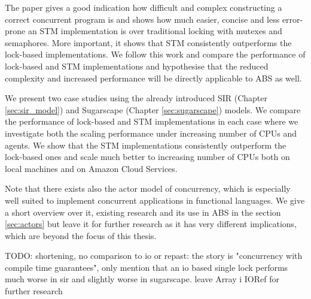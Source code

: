 \medskip

The paper \cite{discolo_lock_2006} gives a good indication how difficult and complex constructing a correct concurrent program is and shows how much easier, concise and less error-prone an STM implementation is over traditional locking with mutexes and semaphores. More important, it shows that STM consistently outperforms the lock-based implementations. We follow this work and compare the performance of lock-based and STM implementations and hypothesise that the reduced complexity and increased performance will be directly applicable to ABS as well.

We present two case studies using the already introduced SIR (Chapter \ref{sec:sir_model}) and Sugarscape (Chapter \ref{sec:sugarscape}) models. We compare the performance of lock-based and STM implementations in each case where we investigate both the scaling performance under increasing number of CPUs and agents. We show that the STM implementations consistently outperform the lock-based ones and scale much better to increasing number of CPUs both on local machines and on Amazon Cloud Services.

Note that there exists also the actor model of concurrency, which is especially well suited to implement concurrent applications in functional languages. We give a short overview over it, existing research and its use in ABS in the section \ref{sec:actors} but leave it for further research as it has very different implications, which are beyond the focus of this thesis.

TODO: shortening, no comparison to io or repast: the story is "concurrency with compile time guarantees", only mention that an io based single lock performs much worse in sir and slightly worse in sugarscape. leave Array i IORef for further research





